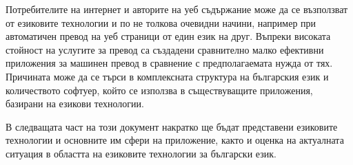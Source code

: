 \documentclass[]{../../metanetpaper}
\begin{document}
\begin{multicols}{2}
Потребителите на интернет и авторите на уеб съдържание може да се възползват от езиковите технологии и по не толкова очевидни начини, например при автоматичен превод на уеб страници от един език на друг. Въпреки високата стойност на услугите за превод са създадени сравнително малко ефективни приложения за машинен превод в сравнение с предполагаемата нужда от тях. Причината може да се търси в комплексната структура на българския език и количеството софтуер, който се използва в съществуващите приложения, базирани на езикови технологии. 

В следващата част на този документ накратко ще бъдат представени езиковите технологии и основните им сфери на приложение, както и оценка на актуалната ситуация в областта на езиковите технологии за български език. 
\end{multicols}

\clearpage


\end{document}
